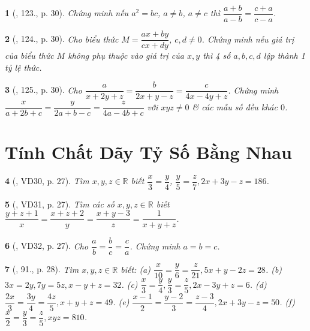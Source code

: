 \documentclass{article}
\newtheorem{baitoan}{}
\begin{document}
\begin{baitoan}[\cite{Tuyen_Toan_7}, 123., p. 30]
	Chứng minh nếu $a^2 = bc$, $a\ne b$, $a\ne c$ thì $\dfrac{a + b}{a - b} = \dfrac{c + a}{c - a}$.
\end{baitoan}

\begin{baitoan}[\cite{Tuyen_Toan_7}, 124., p. 30]
	Cho biểu thức $M = \dfrac{ax + by}{cx + dy}$, $c,d\ne 0$. Chứng minh nếu giá trị của biểu thức $M$ không phụ thuộc vào giá trị của $x,y$ thì 4 số $a,b,c,d$ lập thành 1 tỷ lệ thức.
\end{baitoan}

\begin{baitoan}[\cite{Tuyen_Toan_7}, 125., p. 30]
	Cho $\dfrac{a}{x + 2y + z} = \dfrac{b}{2x + y - z} = \dfrac{c}{4x - 4y + z}$. Chứng minh $\dfrac{x}{a + 2b + c} = \dfrac{y}{2a + b - c} = \dfrac{z}{4a - 4b + c}$ với $xyz\ne 0$ \& các mẫu số đều khác $0$.
\end{baitoan}


\section{Tính Chất Dãy Tỷ Số Bằng Nhau}

\begin{baitoan}[\cite{Binh_Toan_7_tap_1}, VD30, p. 27]
	Tìm $x,y,z\in\mathbb{R}$ biết $\dfrac{x}{3} = \dfrac{y}{4}$, $\dfrac{y}{5} = \dfrac{z}{7},2x + 3y - z = 186$.
\end{baitoan}

\begin{baitoan}[\cite{Binh_Toan_7_tap_1}, VD31, p. 27]
	Tìm các số $x,y,z\in\mathbb{R}$ biết $\dfrac{y + z + 1}{x} = \dfrac{x + z + 2}{y} = \dfrac{x + y - 3}{z} = \dfrac{1}{x + y + z}$.
\end{baitoan}

\begin{baitoan}[\cite{Binh_Toan_7_tap_1}, VD32, p. 27]
	Cho $\dfrac{a}{b} = \dfrac{b}{c} = \dfrac{c}{a}$. Chứng minh $a = b = c$.
\end{baitoan}

\begin{baitoan}[\cite{Binh_Toan_7_tap_1}, 91., p. 28]
	Tìm $x,y,z\in\mathbb{R}$ biết: (a) $\dfrac{x}{10} = \dfrac{y}{6} = \dfrac{z}{21},5x + y - 2z = 28$. (b) $3x = 2y,7y = 5z,x - y + z = 32$. (c) $\dfrac{x}{3} = \dfrac{y}{4},\dfrac{y}{3} = \dfrac{z}{5},2x - 3y + z = 6$. (d) $\dfrac{2x}{3} = \dfrac{3y}{4} = \dfrac{4z}{5},x + y + z = 49$. (e) $\dfrac{x - 1}{2} = \dfrac{y - 2}{3} = \dfrac{z - 3}{4},2x + 3y - z = 50$. (f) $\dfrac{x}{2} = \dfrac{y}{3} = \dfrac{z}{5},xyz = 810$.	
\end{baitoan}
\end{document}
